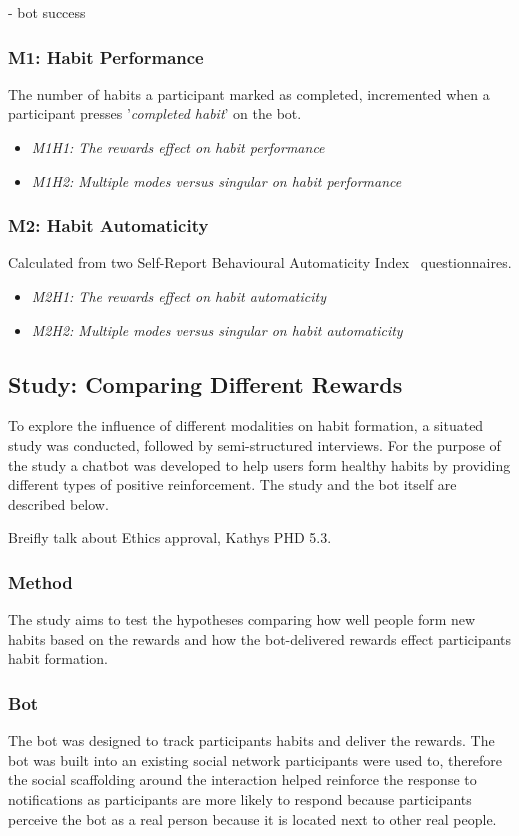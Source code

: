 - bot success


\subsubsection{M1: Habit Performance}
The number of habits a participant marked as completed, incremented when a participant presses '\textit{completed habit}' on the bot.

\begin{itemize}
  \item \textit{M1H1: The rewards effect on habit performance}
  \item \textit{M1H2: Multiple modes versus singular on habit performance}
\end{itemize}

\subsubsection{M2: Habit Automaticity}
Calculated from two Self-Report Behavioural Automaticity Index~\cite{article_4q_SRBAI} questionnaires.
\begin{itemize}
\item \textit{M2H1: The rewards effect on habit automaticity}
\item \textit{M2H2: Multiple modes versus singular on habit automaticity}
\end{itemize}

\subsection{Study: Comparing Different Rewards}
To explore the influence of different modalities on habit formation, a situated study was conducted, followed by semi-structured interviews. For the purpose of the study a chatbot was developed to help users form healthy habits by providing different types of positive reinforcement. The study and the bot itself are described below.

Breifly talk about Ethics approval, Kathys PHD 5.3.\newline

\subsubsection{Method}
The study aims to test the hypotheses comparing how well people form new habits based on the rewards and how the bot-delivered rewards effect participants habit formation.

\subsubsection*{Bot}
The bot was designed to track participants habits and deliver the rewards. The bot was built into an existing social network participants were used to, therefore the social scaffolding around the interaction helped reinforce the response to notifications as participants are more likely to respond because participants perceive the bot as a real person because it is located next to other real people.

